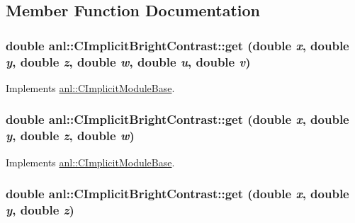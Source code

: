 \subsection{Member Function Documentation}
\hypertarget{classanl_1_1CImplicitBrightContrast_afeb937d994d492fa69cbbe61bdc8adfc}{
\subsubsection[{get}]{\setlength{\rightskip}{0pt plus 5cm}double anl::CImplicitBrightContrast::get (double {\em x}, \/  double {\em y}, \/  double {\em z}, \/  double {\em w}, \/  double {\em u}, \/  double {\em v})}}
\label{classanl_1_1CImplicitBrightContrast_afeb937d994d492fa69cbbe61bdc8adfc}


Implements \hyperlink{classanl_1_1CImplicitModuleBase_aa40b7d54572197612a4fea44b63447eb}{anl::CImplicitModuleBase}.\hypertarget{classanl_1_1CImplicitBrightContrast_a8b2497875f7c2d22cc723673358c3463}{
\subsubsection[{get}]{\setlength{\rightskip}{0pt plus 5cm}double anl::CImplicitBrightContrast::get (double {\em x}, \/  double {\em y}, \/  double {\em z}, \/  double {\em w})}}
\label{classanl_1_1CImplicitBrightContrast_a8b2497875f7c2d22cc723673358c3463}


Implements \hyperlink{classanl_1_1CImplicitModuleBase_a3cf520bdab59631864253c03b4e1723f}{anl::CImplicitModuleBase}.\hypertarget{classanl_1_1CImplicitBrightContrast_a545704ba2a73a8b58e5e07751a706f3a}{
\subsubsection[{get}]{\setlength{\rightskip}{0pt plus 5cm}double anl::CImplicitBrightContrast::get (double {\em x}, \/  double {\em y}, \/  double {\em z})}}
\label{classanl_1_1CImplicitBrightContrast_a545704ba2a73a8b58e5e07751a706f3a}


